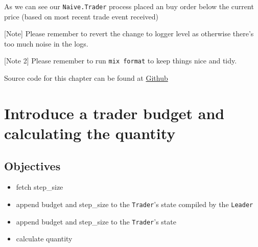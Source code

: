 \documentclass[
]{book}
\newenvironment{Shaded}{\begin{snugshade}}{\end{snugshade}}
\newcommand{\AttributeTok}[1]{\textcolor[rgb]{0.77,0.63,0.00}{#1}}
\newcommand{\CommentTok}[1]{\textcolor[rgb]{0.56,0.35,0.01}{\textit{#1}}}
\newcommand{\ErrorTok}[1]{\textcolor[rgb]{0.64,0.00,0.00}{\textbf{#1}}}
\newcommand{\ExtensionTok}[1]{#1}
\newcommand{\KeywordTok}[1]{\textcolor[rgb]{0.13,0.29,0.53}{\textbf{#1}}}
\newcommand{\NormalTok}[1]{#1}
\newcommand{\OperatorTok}[1]{\textcolor[rgb]{0.81,0.36,0.00}{\textbf{#1}}}
\newcommand{\StringTok}[1]{\textcolor[rgb]{0.31,0.60,0.02}{#1}}
\providecommand{\tightlist}{%
  \setlength{\itemsep}{0pt}\setlength{\parskip}{0pt}}
\begin{document}
\begin{Shaded}
\end{Shaded}

As we can see our \texttt{Naive.Trader} process placed an buy order below the current price (based on most recent trade event received)

{[}Note{]} Please remember to revert the change to logger level as otherwise there's too much noise in the logs.

{[}Note 2{]} Please remember to run \texttt{mix\ format} to keep things nice and tidy.

Source code for this chapter can be found at \href{https://github.com/frathon/create-a-cryptocurrency-trading-bot-in-elixir-source-code/tree/chapter_06}{Github}

\hypertarget{introduce-a-trader-budget-and-calculating-the-quantity}{%
\chapter{Introduce a trader budget and calculating the quantity}\label{introduce-a-trader-budget-and-calculating-the-quantity}}

\hypertarget{objectives-6}{%
\section{Objectives}\label{objectives-6}}

\begin{itemize}
\tightlist
\item
  fetch step\_size
\item
  append budget and step\_size to the \texttt{Trader}'s state compiled by the \texttt{Leader}
\item
  append budget and step\_size to the \texttt{Trader}'s state
\item
  calculate quantity
\end{itemize}
\end{document}
